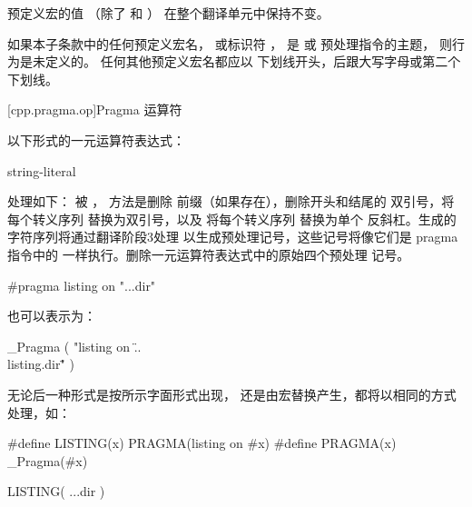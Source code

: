     \pnum
    预定义宏的值
    （除了
    和
    ）
    在整个翻译单元中保持不变。
    
    \pnum
    如果本子条款中的任何预定义宏名，
    或标识符
    ，
    是
    或
    预处理指令的主题，
    则行为是未定义的。
    任何其他预定义宏名都应以
    下划线开头，后跟大写字母或第二个
    下划线。
    
    [cpp.pragma.op]{Pragma 运算符}%
    
    \pnum
    以下形式的一元运算符表达式：
    \begin{ncbnf}
     \terminal{(} string-literal \terminal{)}
    \end{ncbnf}
    处理如下： 被 ，
    方法是删除  前缀（如果存在），删除开头和结尾的
    双引号，将每个转义序列  替换为双引号，以及
    将每个转义序列 \tcode{\textbackslash\textbackslash} 替换为单个
    反斜杠。生成的字符序列将通过翻译阶段3处理
    以生成预处理记号，这些记号将像它们是
    pragma 指令中的  一样执行。删除一元运算符表达式中的原始四个预处理
    记号。
    
    \pnum
    \begin{example}
    \begin{codeblock}
    #pragma listing on "..\listing.dir"
    \end{codeblock}
    也可以表示为：
    \begin{codeblock}
    _Pragma ( "listing on \"..\\listing.dir\"" )
    \end{codeblock}
    无论后一种形式是按所示字面形式出现，
    还是由宏替换产生，都将以相同的方式处理，如：
    \begin{codeblock}
    #define LISTING(x) PRAGMA(listing on #x)
    #define PRAGMA(x) _Pragma(#x)
    
    LISTING( ..\listing.dir )
    \end{codeblock}
    \end{example}
    
